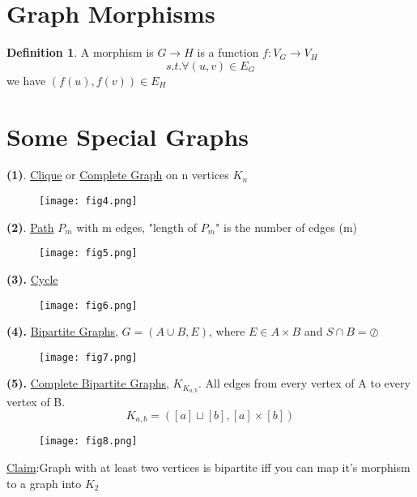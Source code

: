 \documentclass{article}
\theoremstyle{definition}
\newtheorem{definition}{Definition}
\begin{document}
\section{Graph Morphisms}

\begin{definition}
A morphism is $G\rightarrow H$ is a function $f:V_G\rightarrow V_H$ 
$$s.t.\forall\left( u,v \right)\in E_G$$ 
we have $\left( f\left( u \right) ,f\left( v \right) \right) \in E_H$
\end{definition}

\newpage 

\section{Some Special Graphs}

\quad \textbf{(1)}. \underline{Clique} or \underline{Complete Graph} on n vertices $K_n$
   \begin{figure}[h]
    \centering
      \texttt{[image: fig4.png]}
    \end{figure}
    
\textbf{(2)}. \underline{Path} $P_m$ with m edges, "length of $P_m$" is the number of edges (m)
   \begin{figure}[h]
    \centering
      \texttt{[image: fig5.png]}
    \end{figure}
    
\textbf{(3).} \underline{Cycle}
   \begin{figure}[h]
    \centering
      \texttt{[image: fig6.png]}
    \end{figure}
    
\textbf{(4).} \underline{Bipartite Graphs}, $G=\left( A\cup B,E \right) $, where $E \in A \times B$ and $S \cap B = \oslash $
   \begin{figure}[h]
    \centering
      \texttt{[image: fig7.png]}
    \end{figure}
    
\newpage
\textbf{(5).} \underline{Complete Bipartite Graphs}, $K_K_{a,b}$. All edges from every vertex of A to every vertex of B. $$K_{a,b}=\left( \left[ a \right] \sqcup \left[ b \right] ,\left[ a \right] \times \left[ b \right] \right)$$
\begin{figure}[h]
\centering
  \texttt{[image: fig8.png]}
\end{figure}

\underline{Claim}:Graph with at least two vertices is bipartite iff you can map it's morphism to a graph into $K_2$
\end{document}
